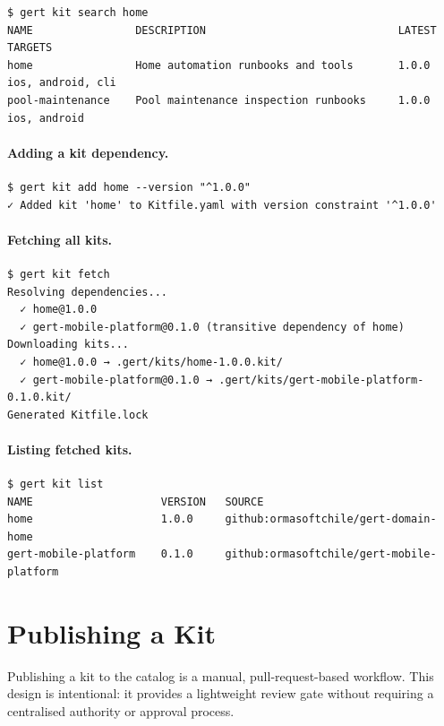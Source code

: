 \begin{verbatim}
$ gert kit search home
NAME                DESCRIPTION                              LATEST   TARGETS
home                Home automation runbooks and tools       1.0.0    ios, android, cli
pool-maintenance    Pool maintenance inspection runbooks     1.0.0    ios, android
\end{verbatim}

\paragraph{Adding a kit dependency.}

\begin{verbatim}
$ gert kit add home --version "^1.0.0"
✓ Added kit 'home' to Kitfile.yaml with version constraint '^1.0.0'
\end{verbatim}

\paragraph{Fetching all kits.}

\begin{verbatim}
$ gert kit fetch
Resolving dependencies...
  ✓ home@1.0.0
  ✓ gert-mobile-platform@0.1.0 (transitive dependency of home)
Downloading kits...
  ✓ home@1.0.0 → .gert/kits/home-1.0.0.kit/
  ✓ gert-mobile-platform@0.1.0 → .gert/kits/gert-mobile-platform-0.1.0.kit/
Generated Kitfile.lock
\end{verbatim}

\paragraph{Listing fetched kits.}

\begin{verbatim}
$ gert kit list
NAME                    VERSION   SOURCE
home                    1.0.0     github:ormasoftchile/gert-domain-home
gert-mobile-platform    0.1.0     github:ormasoftchile/gert-mobile-platform
\end{verbatim}

\section{Publishing a Kit}
\label{sec:kit-publishing}

Publishing a kit to the catalog is a manual, pull-request-based workflow. This design is intentional: it provides a lightweight review gate without requiring a centralised authority or approval process.

